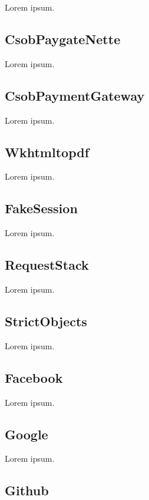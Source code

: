 Lorem ipsum.

\subsection{CsobPaygateNette} \label{sec:state:csob-paygate-nette}

Lorem ipsum.

\subsection{CsobPaymentGateway} \label{sec:state:csob-payment-gateway}

Lorem ipsum.

\subsection{Wkhtmltopdf} \label{sec:state:wkhtmltopdf}

Lorem ipsum.

\subsection{FakeSession} \label{sec:state:fake-session}

Lorem ipsum.

\subsection{RequestStack} \label{sec:state:request-stack}

Lorem ipsum.

\subsection{StrictObjects} \label{sec:state:strict-objects}

Lorem ipsum.

\subsection{Facebook} \label{sec:state:facebook}

Lorem ipsum.

\subsection{Google} \label{sec:state:google}

Lorem ipsum.

\subsection{Github} \label{sec:state:github}


